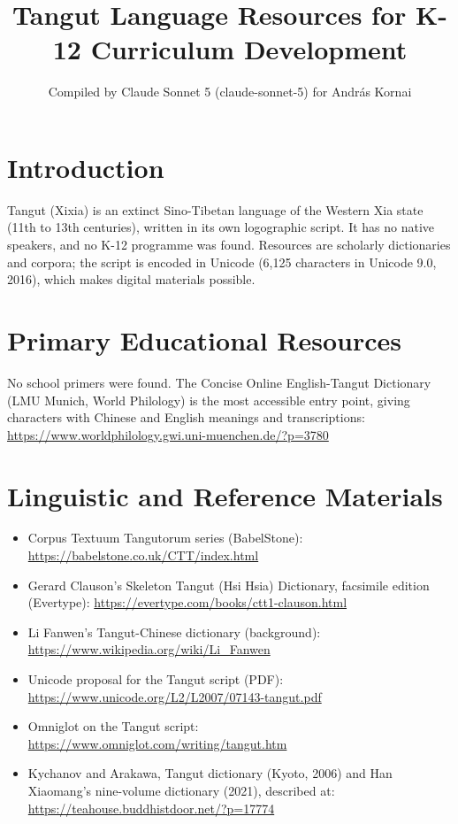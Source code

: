 \documentclass[12pt]{article}
\title{Tangut Language Resources for K-12 Curriculum Development}
\author{Compiled by Claude Sonnet 5 (claude-sonnet-5) for Andr\'as Kornai}
\date{}
\begin{document}
\maketitle

\section{Introduction}
Tangut (Xixia) is an extinct Sino-Tibetan language of the Western Xia state (11th to 13th centuries), written in its own logographic script. It has no native speakers, and no K-12 programme was found. Resources are scholarly dictionaries and corpora; the script is encoded in Unicode (6,125 characters in Unicode 9.0, 2016), which makes digital materials possible.

\section{Primary Educational Resources}
No school primers were found. The Concise Online English-Tangut Dictionary (LMU Munich, World Philology) is the most accessible entry point, giving characters with Chinese and English meanings and transcriptions: \url{https://www.worldphilology.gwi.uni-muenchen.de/?p=3780}

\section{Linguistic and Reference Materials}
\begin{itemize}
\item Corpus Textuum Tangutorum series (BabelStone): \url{https://babelstone.co.uk/CTT/index.html}
\item Gerard Clauson's Skeleton Tangut (Hsi Hsia) Dictionary, facsimile edition (Evertype): \url{https://evertype.com/books/ctt1-clauson.html}
\item Li Fanwen's Tangut-Chinese dictionary (background): \url{https://www.wikipedia.org/wiki/Li_Fanwen}
\item Unicode proposal for the Tangut script (PDF): \url{https://www.unicode.org/L2/L2007/07143-tangut.pdf}
\item Omniglot on the Tangut script: \url{https://www.omniglot.com/writing/tangut.htm}
\item Kychanov and Arakawa, Tangut dictionary (Kyoto, 2006) and Han Xiaomang's nine-volume dictionary (2021), described at: \url{https://teahouse.buddhistdoor.net/?p=17774}
\end{itemize}
\end{document}
